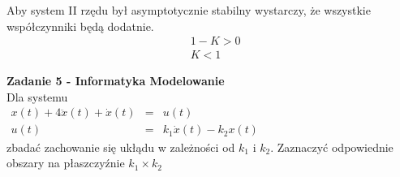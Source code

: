 \documentclass[a4paper,11pt]{article}
\begin{document}
Aby system II rzędu był asymptotycznie stabilny wystarczy, że wszystkie współczynniki będą dodatnie. 
\begin{align*}
&1-K>0\\
&K<1
\end{align*}

\newpage
\begin{framed}
\textbf{Zadanie 5 - Informatyka Modelowanie } \\ 
Dla systemu\\
	$\begin{array}{rcl}x(t)+4\ddot{x}(t)+\dot{x}(t)&=&u(t) \\ u(t)&=&k_1\dot{x}(t)-k_2x(t)\end{array}$\\
zbadać zachowanie się ukłądu w zależności od $k_1$ i $k_2$. Zaznaczyć odpowiednie obszary na płaszczyźnie $k_1 \times k_2$
\end{framed}
\end{document}
